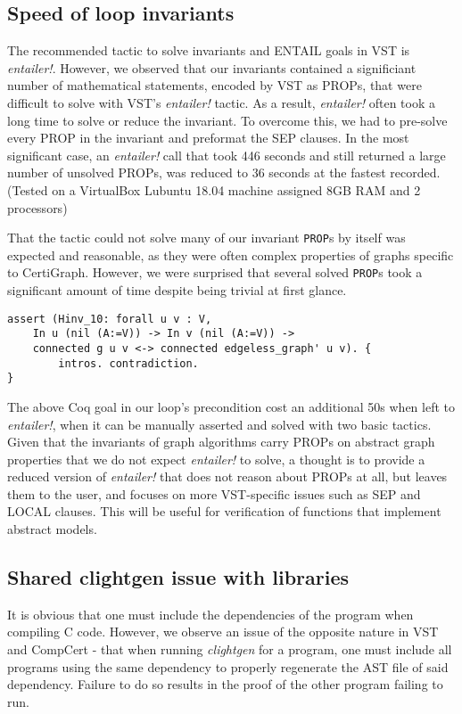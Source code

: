 \subsection{Speed of loop invariants}
The recommended tactic to solve invariants and ENTAIL goals in VST is \textit{entailer!}. However, we observed that our invariants contained a significiant number of mathematical statements, encoded by VST as PROPs, that were difficult to solve with VST's \textit{entailer!} tactic. As a result, \textit{entailer!} often took a long time to solve or reduce the invariant. To overcome this, we had to pre-solve every PROP in the invariant and preformat the SEP clauses. In the most significant case, an \textit{entailer!} call that took 446 seconds and still returned a large number of unsolved PROPs, was reduced to 36 seconds at the fastest recorded. (Tested on a VirtualBox Lubuntu 18.04 machine assigned 8GB RAM and 2 processors)

That the tactic could not solve many of our invariant \texttt{PROP}s by itself was expected and reasonable, as they were often complex properties of graphs specific to CertiGraph. However, we were surprised that several solved \texttt{PROP}s took a significant amount of time despite being trivial at first glance.
\begin{lstlisting}
assert (Hinv_10: forall u v : V,
	In u (nil (A:=V)) -> In v (nil (A:=V)) ->
	connected g u v <-> connected edgeless_graph' u v). {
		intros. contradiction.
}
\end{lstlisting}
The above Coq goal in our loop's precondition cost an additional 50s when left to \textit{entailer!}, when it can be manually asserted and solved with two basic tactics.
\newline\newline
Given that the invariants of graph algorithms carry PROPs on abstract graph properties that we do not expect \textit{entailer!} to solve, a thought is to provide a reduced version of \textit{entailer!} that does not reason about PROPs at all, but leaves them to the user, and focuses on more VST-specific issues such as SEP and LOCAL clauses. This will be useful for verification of functions that implement abstract models.

\subsection{Shared clightgen issue with libraries} It is obvious that one must include the dependencies of the program when compiling C code. However, we observe an issue of the opposite nature in VST and CompCert - that when running \textit{clightgen} for a program, one must include all programs using the same dependency to properly regenerate the AST file of said dependency. Failure to do so results in the proof of the other program failing to run.

